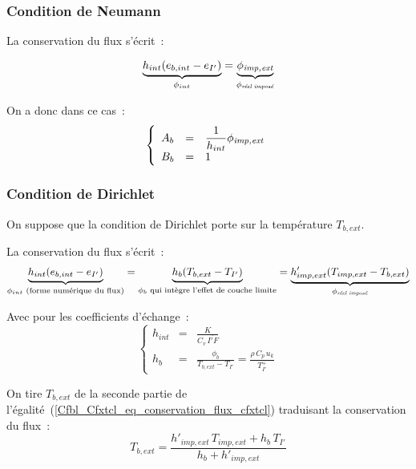 \subsubsection*{Condition de Neumann}

La conservation du flux s'\'ecrit~:

\begin{equation}
    \underbrace{h_{int}(e_{b,int}-e_{I'})}_{\phi_{int}}
    =\underbrace{\phi_{\text{\it imp,ext}}}_{\phi_{\text{\it r\'eel impos\'e}}}
\end{equation}

On a donc dans ce cas~:
\begin{equation}
\left\{\begin{array}{lll}
  A_b &= &\displaystyle\frac{1}{h_{int}}\phi_{\text{\it imp,ext}}\\
  B_b &= &1
\end{array}\right.
\end{equation}


\subsubsection*{Condition de Dirichlet}

On suppose que la condition de Dirichlet porte sur la temp\'erature $T_{b,ext}$.


La conservation du flux s'\'ecrit~:
\begin{equation}\label{Cfbl_Cfxtcl_eq_conservation_flux_cfxtcl}
    \underbrace{h_{int}(e_{b,int}-e_{I'})}_{\phi_{int}\text{\ (forme num\'erique
du flux)}}
  = \underbrace{h_{b}(T_{b,ext}-T_{I'})}_{\phi_{b}\text{ qui int\`egre l'effet
de couche limite}}
  =
    \underbrace{h'_{imp,ext}(T_{imp,ext}-T_{b,ext})}_{\phi_{\text{\it r\'eel
impos\'e}}}
\end{equation}

Avec pour les coefficients d'\'echange~:
\begin{equation}
\left\{\begin{array}{lll}
h_{int}&=&\displaystyle\frac{K}{C_v\,\overline{I'F}}\\
h_b&=&\displaystyle\frac{\phi_b}{T_{b,ext}-T_{I'}}=\frac{\rho\,C_p\,u_k}{T^+_{I'}}
\end{array}\right.
\end{equation}

On tire $T_{b,ext}$
de la seconde partie de l'\'egalit\'e~(\ref{Cfbl_Cfxtcl_eq_conservation_flux_cfxtcl})
traduisant la conservation du flux~:
\begin{equation}
\displaystyle T_{b,ext} = \frac{h'_{imp,ext}\,T_{imp,ext}+h_b\,T_{I'}}{h_b+h'_{imp,ext}}
\end{equation}

